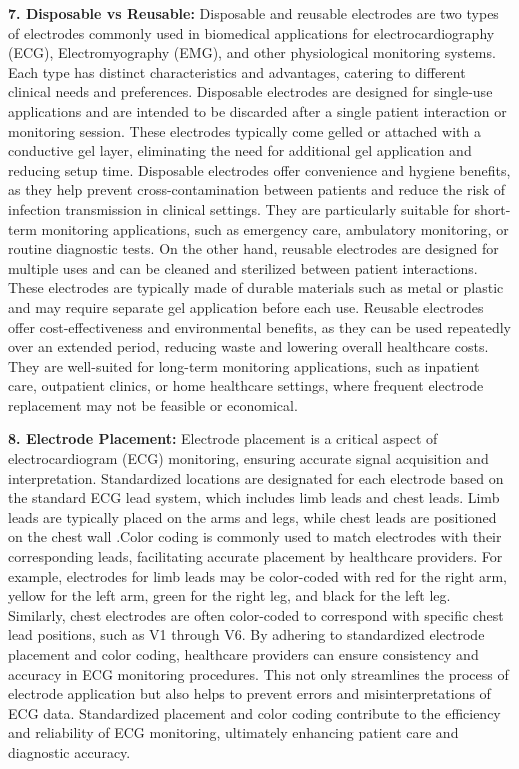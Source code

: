 \textbf{7. Disposable vs Reusable:}
         Disposable and reusable electrodes are two types of electrodes commonly used in biomedical applications for electrocardiography (ECG), Electromyography\cite{schwartz1978facial} (EMG), and other physiological monitoring systems. Each type has distinct characteristics and advantages, catering to different clinical needs and preferences.
         Disposable electrodes are designed for single-use applications and are intended to be discarded after a single patient interaction or monitoring session. These electrodes typically come gelled or attached with a conductive gel layer, eliminating the need for additional gel application and reducing setup time. Disposable electrodes offer convenience and hygiene benefits, as they help prevent cross-contamination between patients and reduce the risk of infection transmission in clinical settings. They are particularly suitable for short-term monitoring applications, such as emergency care, ambulatory monitoring, or routine diagnostic tests.
        On the other hand, reusable electrodes are designed for multiple uses and can be cleaned and sterilized between patient interactions. These electrodes are typically made of durable materials such as metal or plastic and may require separate gel application before each use. Reusable electrodes offer cost-effectiveness and environmental benefits, as they can be used repeatedly over an extended period, reducing waste and lowering overall healthcare costs. They are well-suited for long-term monitoring applications, such as inpatient care, outpatient clinics, or home healthcare settings, where frequent electrode replacement may not be feasible or economical.

\textbf{8. Electrode Placement:}
    Electrode placement is a critical aspect of electrocardiogram (ECG) monitoring, ensuring accurate signal acquisition and interpretation. Standardized locations are designated for each electrode based on the standard ECG lead system, which includes limb leads and chest leads. Limb leads are typically placed on the arms and legs, while chest leads are positioned on the chest wall \cite{pesti2020electrode} .Color coding is commonly used to match electrodes with their corresponding leads, facilitating accurate placement by healthcare providers. For example, electrodes for limb leads may be color-coded with red for the right arm, yellow for the left arm, green for the right leg, and black for the left leg. Similarly, chest electrodes are often color-coded to correspond with specific chest lead positions, such as V1 through V6.
    By adhering to standardized electrode placement and color coding, healthcare providers can ensure consistency and accuracy in ECG monitoring procedures. This not only streamlines the process of electrode application but also helps to prevent errors and misinterpretations of ECG data. Standardized placement and color coding contribute to the efficiency and reliability of ECG monitoring, ultimately enhancing patient care and diagnostic accuracy.

